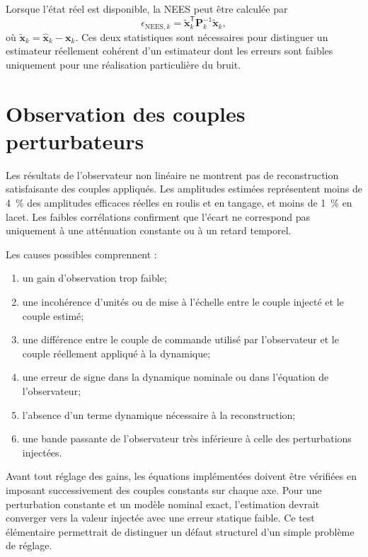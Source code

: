 \documentclass[11pt,a4paper,oneside]{report}
\newcommand{\vect}[1]{\bm{#1}}
\newcommand{\trans}{^{\mathsf T}}
\begin{document}
Lorsque l'état réel est disponible, la NEES peut être calculée par
\begin{equation}
	\epsilon_{\mathrm{NEES},k}
	=
	\tilde{\vect x}_k\trans
	\mathbf P_k^{-1}
	\tilde{\vect x}_k,
	\label{eq_discussion_nees}
\end{equation}
où $\tilde{\vect x}_k=\hat{\vect x}_k-\vect x_k$. Ces deux statistiques sont nécessaires pour distinguer un estimateur réellement cohérent d'un estimateur dont les erreurs sont faibles uniquement pour une réalisation particulière du bruit.

\section{Observation des couples perturbateurs}

Les résultats de l'observateur non linéaire ne montrent pas de reconstruction satisfaisante des couples appliqués. Les amplitudes estimées représentent moins de \SI{4}{\percent} des amplitudes efficaces réelles en roulis et en tangage, et moins de \SI{1}{\percent} en lacet. Les faibles corrélations confirment que l'écart ne correspond pas uniquement à une atténuation constante ou à un retard temporel.

Les causes possibles comprennent :
\begin{enumerate}
	\item un gain d'observation trop faible;
	\item une incohérence d'unités ou de mise à l'échelle entre le couple injecté et le couple estimé;
	\item une différence entre le couple de commande utilisé par l'observateur et le couple réellement appliqué à la dynamique;
	\item une erreur de signe dans la dynamique nominale ou dans l'équation de l'observateur;
	\item l'absence d'un terme dynamique nécessaire à la reconstruction;
	\item une bande passante de l'observateur très inférieure à celle des perturbations injectées.
\end{enumerate}

Avant tout réglage des gains, les équations implémentées doivent être vérifiées en imposant successivement des couples constants sur chaque axe. Pour une perturbation constante et un modèle nominal exact, l'estimation devrait converger vers la valeur injectée avec une erreur statique faible. Ce test élémentaire permettrait de distinguer un défaut structurel d'un simple problème de réglage.
\end{document}
